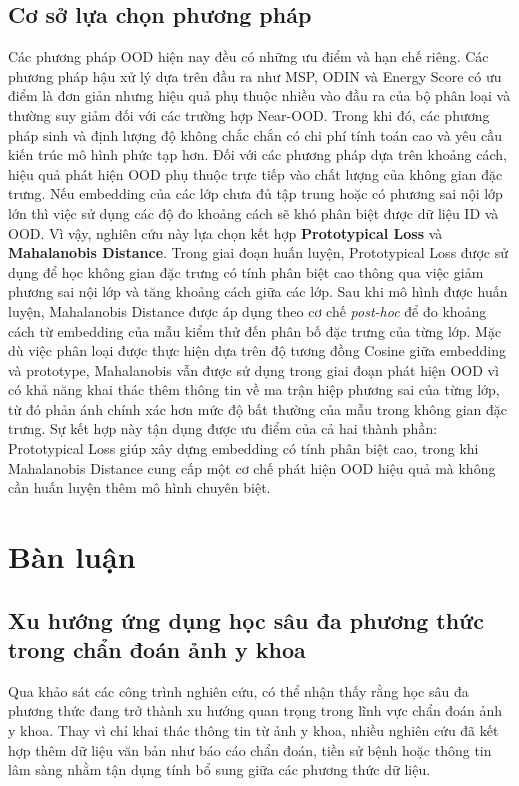 \subsection{Cơ sở lựa chọn phương pháp} Các phương pháp OOD hiện nay đều có những ưu điểm và hạn chế riêng. Các phương pháp hậu xử lý dựa trên đầu ra như MSP, ODIN và Energy Score có ưu điểm là đơn giản nhưng hiệu quả phụ thuộc nhiều vào đầu ra của bộ phân loại và thường suy giảm đối với các trường hợp Near-OOD. Trong khi đó, các phương pháp sinh và định lượng độ không chắc chắn có chi phí tính toán cao và yêu cầu kiến trúc mô hình phức tạp hơn. Đối với các phương pháp dựa trên khoảng cách, hiệu quả phát hiện OOD phụ thuộc trực tiếp vào chất lượng của không gian đặc trưng. Nếu embedding của các lớp chưa đủ tập trung hoặc có phương sai nội lớp lớn thì việc sử dụng các độ đo khoảng cách sẽ khó phân biệt được dữ liệu ID và OOD. Vì vậy, nghiên cứu này lựa chọn kết hợp \textbf{Prototypical Loss} và \textbf{Mahalanobis Distance}. Trong giai đoạn huấn luyện, Prototypical Loss được sử dụng để học không gian đặc trưng có tính phân biệt cao thông qua việc giảm phương sai nội lớp và tăng khoảng cách giữa các lớp. Sau khi mô hình được huấn luyện, Mahalanobis Distance được áp dụng theo cơ chế \textit{post-hoc} để đo khoảng cách từ embedding của mẫu kiểm thử đến phân bố đặc trưng của từng lớp. Mặc dù việc phân loại được thực hiện dựa trên độ tương đồng Cosine giữa embedding và prototype, Mahalanobis vẫn được sử dụng trong giai đoạn phát hiện OOD vì có khả năng khai thác thêm thông tin về ma trận hiệp phương sai của từng lớp, từ đó phản ánh chính xác hơn mức độ bất thường của mẫu trong không gian đặc trưng. Sự kết hợp này tận dụng được ưu điểm của cả hai thành phần: Prototypical Loss giúp xây dựng embedding có tính phân biệt cao, trong khi Mahalanobis Distance cung cấp một cơ chế phát hiện OOD hiệu quả mà không cần huấn luyện thêm mô hình chuyên biệt.

\section{Bàn luận}

\subsection{Xu hướng ứng dụng học sâu đa phương thức trong chẩn đoán ảnh y khoa}

Qua khảo sát các công trình nghiên cứu, có thể nhận thấy rằng học sâu đa phương thức đang trở thành xu hướng quan trọng trong lĩnh vực chẩn đoán ảnh y khoa. Thay vì chỉ khai thác thông tin từ ảnh y khoa, nhiều nghiên cứu đã kết hợp thêm dữ liệu văn bản như báo cáo chẩn đoán, tiền sử bệnh hoặc thông tin lâm sàng nhằm tận dụng tính bổ sung giữa các phương thức dữ liệu.


